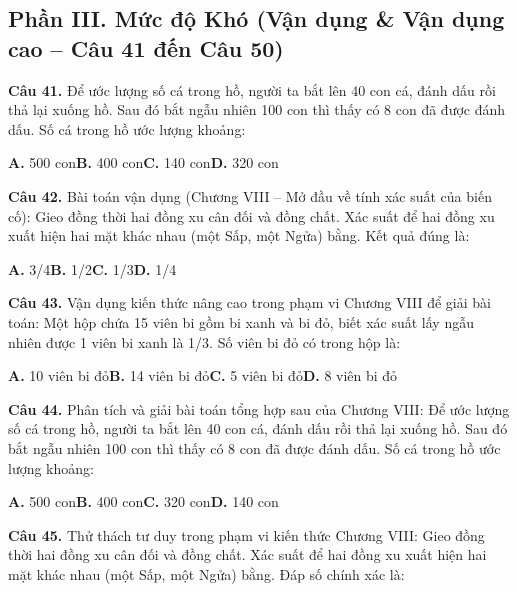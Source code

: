 \documentclass[11pt,a4paper]{article}
\begin{document}
\subsection*{\color{accent} Phần III. Mức độ Khó (Vận dụng \& Vận dụng cao -- Câu 41 đến Câu 50)}
\textbf{\color{primary} Câu 41.} Để ước lượng số cá trong hồ, người ta bắt lên 40 con cá, đánh dấu rồi thả lại xuống hồ. Sau đó bắt ngẫu nhiên 100 con thì thấy có 8 con đã được đánh dấu. Số cá trong hồ ước lượng khoảng:\par
\hspace*{1.5em}\textbf{A.} 500 con\quad\quad \textbf{B.} 400 con\quad\quad \textbf{C.} 140 con\quad\quad \textbf{D.} 320 con\par\vspace{2pt}
\textbf{\color{primary} Câu 42.} Bài toán vận dụng (Chương VIII – Mở đầu về tính xác suất của biến cố): Gieo đồng thời hai đồng xu cân đối và đồng chất. Xác suất để hai đồng xu xuất hiện hai mặt khác nhau (một Sấp, một Ngửa) bằng. Kết quả đúng là:\par
\hspace*{1.5em}\textbf{A.} 3/4\quad\quad \textbf{B.} 1/2\quad\quad \textbf{C.} 1/3\quad\quad \textbf{D.} 1/4\par\vspace{2pt}
\textbf{\color{primary} Câu 43.} Vận dụng kiến thức nâng cao trong phạm vi Chương VIII để giải bài toán: Một hộp chứa 15 viên bi gồm bi xanh và bi đỏ, biết xác suất lấy ngẫu nhiên được 1 viên bi xanh là 1/3. Số viên bi đỏ có trong hộp là:\par
\hspace*{1.5em}\textbf{A.} 10 viên bi đỏ\quad\quad \textbf{B.} 14 viên bi đỏ\quad\quad \textbf{C.} 5 viên bi đỏ\quad\quad \textbf{D.} 8 viên bi đỏ\par\vspace{2pt}
\textbf{\color{primary} Câu 44.} Phân tích và giải bài toán tổng hợp sau của Chương VIII: Để ước lượng số cá trong hồ, người ta bắt lên 40 con cá, đánh dấu rồi thả lại xuống hồ. Sau đó bắt ngẫu nhiên 100 con thì thấy có 8 con đã được đánh dấu. Số cá trong hồ ước lượng khoảng:\par
\hspace*{1.5em}\textbf{A.} 500 con\quad\quad \textbf{B.} 400 con\quad\quad \textbf{C.} 320 con\quad\quad \textbf{D.} 140 con\par\vspace{2pt}
\textbf{\color{primary} Câu 45.} Thử thách tư duy trong phạm vi kiến thức Chương VIII: Gieo đồng thời hai đồng xu cân đối và đồng chất. Xác suất để hai đồng xu xuất hiện hai mặt khác nhau (một Sấp, một Ngửa) bằng. Đáp số chính xác là:\par
\end{document}
